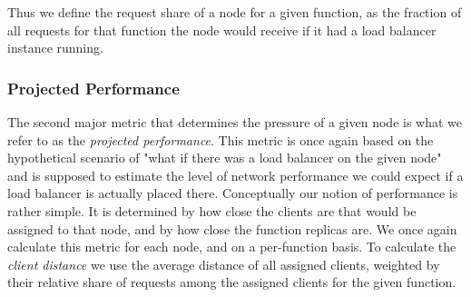 \documentclass[draft,final]{vutinfth} %
\begin{document}
Thus we define the request share of a node for a given function, as the fraction of all requests for that function the node would receive if it had a load balancer instance running.
\subsubsection{Projected Performance}
The second major metric that determines the pressure of a given node is what we refer to as the \textit{projected performance}.
This metric is once again based on the hypothetical scenario of "what if there was a load balancer on the given node" and is supposed to estimate the level of network performance we could expect if a load balancer is actually placed there.
Conceptually our notion of performance is rather simple.
It is determined by how close the clients are that would be assigned to that node, and by how close the function replicas are.
We once again calculate this metric for each node, and on a per-function basis.
To calculate the \textit{client distance} we use the average distance of all assigned clients, weighted by their relative share of requests among the assigned clients for the given function.
\end{document}

